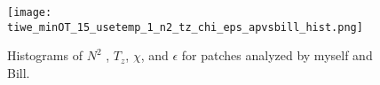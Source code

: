 \documentclass[11pt]{article}
\begin{document}
\begin{figure}[htbp]
\texttt{[image: tiwe\_minOT\_15\_usetemp\_1\_n2\_tz\_chi\_eps\_apvsbill\_hist.png]}
\caption{Histograms of $N^2$ , $T_z$, $\chi$, and $\epsilon$ for patches analyzed by myself and Bill.}
\label{comp_bill_ap_1}
\end{figure}
%




%
%
%
%
%
%
%
%

%
%
%
%
%
%
%
\end{document}
